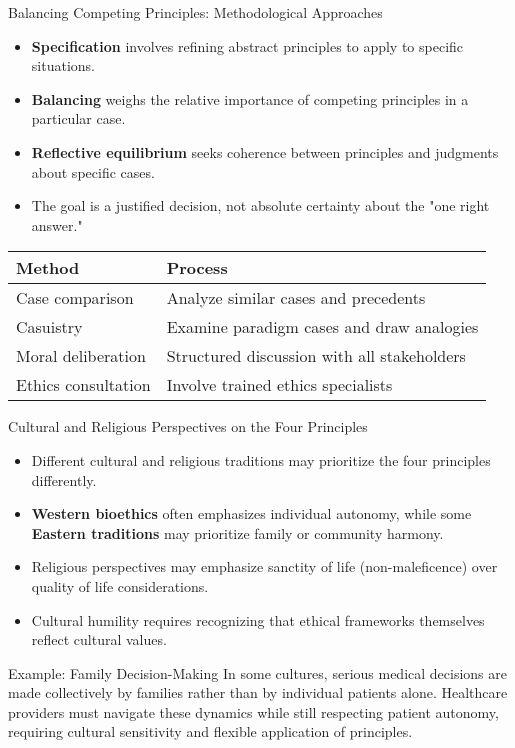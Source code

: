 \documentclass{beamer}
\begin{document}
	\begin{frame}{Balancing Competing Principles: Methodological Approaches}
		\begin{itemize}
			\item \textbf{Specification} involves refining abstract principles to apply to specific situations.
			\item \textbf{Balancing} weighs the relative importance of competing principles in a particular case.
			\item \textbf{Reflective equilibrium} seeks coherence between principles and judgments about specific cases.
			\item The goal is a justified decision, not absolute certainty about the "one right answer."
		\end{itemize}
		
		\begin{table}
			\begin{tabular}{l|l}
				\textbf{Method} & \textbf{Process} \\
				\hline
				Case comparison & Analyze similar cases and precedents \\
				Casuistry & Examine paradigm cases and draw analogies \\
				Moral deliberation & Structured discussion with all stakeholders \\
				Ethics consultation & Involve trained ethics specialists \\
			\end{tabular}
		\end{table}
	\end{frame}
	
	
	\begin{frame}{Cultural and Religious Perspectives on the Four Principles}
		\begin{itemize}
			\item Different cultural and religious traditions may prioritize the four principles differently.
			\item \textbf{Western bioethics} often emphasizes individual autonomy, while some \textbf{Eastern traditions} may prioritize family or community harmony.
			\item Religious perspectives may emphasize sanctity of life (non-maleficence) over quality of life considerations.
			\item Cultural humility requires recognizing that ethical frameworks themselves reflect cultural values.
		\end{itemize}
		
		\begin{exampleblock}{Example: Family Decision-Making}
			In some cultures, serious medical decisions are made collectively by families rather than by individual patients alone. Healthcare providers must navigate these dynamics while still respecting patient autonomy, requiring cultural sensitivity and flexible application of principles.
		\end{exampleblock}
	\end{frame}
	
\end{document}
